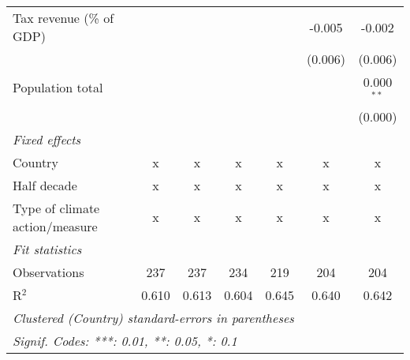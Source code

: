 \begin{tabular}{lcccccc}
   Tax revenue (\% of GDP)                                    &         &         &         &         & -0.005  & -0.002\\   
                                                              &         &         &         &         & (0.006) & (0.006)\\   
   Population total                                           &         &         &         &         &         & 0.000$^{**}$\\   
                                                              &         &         &         &         &         & (0.000)\\   
   \emph{Fixed effects}\\
   Country                                                    & x       & x       & x       & x       & x       & x\\  
   Half decade                                                & x       & x       & x       & x       & x       & x\\  
   Type of climate action/measure                             & x       & x       & x       & x       & x       & x\\  
   \midrule \emph{Fit statistics}\\
   Observations                                               & 237     & 237     & 234     & 219     & 204     & 204\\  
   R$^2$                                                      & 0.610   & 0.613   & 0.604   & 0.645   & 0.640   & 0.642\\  
   \midrule
   \multicolumn{7}{l}{\emph{Clustered (Country) standard-errors in parentheses}}\\
   \multicolumn{7}{l}{\emph{Signif. Codes: ***: 0.01, **: 0.05, *: 0.1}}\\
\end{tabular}
\par\endgroup


